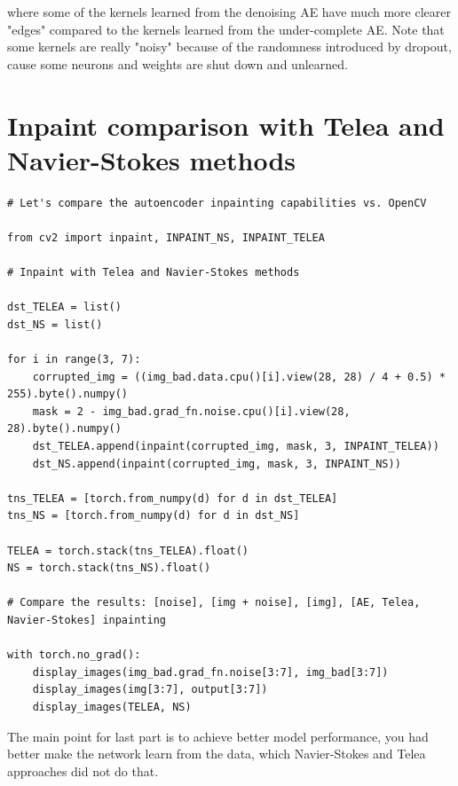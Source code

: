 where some of the kernels learned from the denoising AE have much more clearer "edges" compared to the kernels learned from the under-complete AE. Note that some kernels are really "noisy" because of the randomness introduced by dropout, cause some neurons and weights are shut down and unlearned.

\section{Inpaint comparison with Telea and Navier-Stokes methods}

\begin{verbatim}
# Let's compare the autoencoder inpainting capabilities vs. OpenCV

from cv2 import inpaint, INPAINT_NS, INPAINT_TELEA

# Inpaint with Telea and Navier-Stokes methods

dst_TELEA = list()
dst_NS = list()

for i in range(3, 7):
    corrupted_img = ((img_bad.data.cpu()[i].view(28, 28) / 4 + 0.5) * 255).byte().numpy()
    mask = 2 - img_bad.grad_fn.noise.cpu()[i].view(28, 28).byte().numpy()
    dst_TELEA.append(inpaint(corrupted_img, mask, 3, INPAINT_TELEA))
    dst_NS.append(inpaint(corrupted_img, mask, 3, INPAINT_NS))

tns_TELEA = [torch.from_numpy(d) for d in dst_TELEA]
tns_NS = [torch.from_numpy(d) for d in dst_NS]

TELEA = torch.stack(tns_TELEA).float()
NS = torch.stack(tns_NS).float()

# Compare the results: [noise], [img + noise], [img], [AE, Telea, Navier-Stokes] inpainting

with torch.no_grad():
    display_images(img_bad.grad_fn.noise[3:7], img_bad[3:7])
    display_images(img[3:7], output[3:7])
    display_images(TELEA, NS)
\end{verbatim}

The main point for last part is to achieve better model performance, you had better make the network learn from the data, which Navier-Stokes and Telea approaches did not do that.